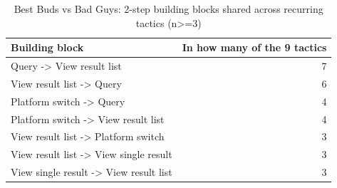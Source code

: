 \begin{table}[t]
\centering
\caption{Best Buds vs Bad Guys: 2-step building blocks shared across recurring tactics (n>=3)}
\label{tab:rq11-building-blocks}
\begin{tabular}{lr}
\toprule
Building block & In how many of the 9 tactics \\
\midrule
Query -> View result list & 7 \\
View result list -> Query & 6 \\
Platform switch -> Query & 4 \\
Platform switch -> View result list & 4 \\
View result list -> Platform switch & 3 \\
View result list -> View single result & 3 \\
View single result -> View result list & 3 \\
\bottomrule
\end{tabular}
\end{table}
